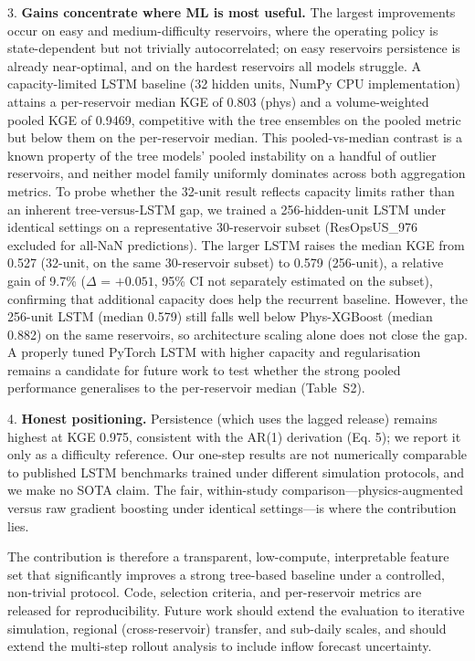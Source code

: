 \documentclass[journal]{ascelike-new}
\begin{document}
3. \textbf{Gains concentrate where ML is most useful.} The largest improvements occur on easy and medium-difficulty reservoirs, where the operating policy is state-dependent but not trivially autocorrelated; on easy reservoirs persistence is already near-optimal, and on the hardest reservoirs all models struggle. A capacity-limited LSTM baseline (32 hidden units, NumPy CPU implementation) attains a per-reservoir median KGE of 0.803 (phys) and a volume-weighted pooled KGE of 0.9469, competitive with the tree ensembles on the pooled metric but below them on the per-reservoir median. This pooled-vs-median contrast is a known property of the tree models' pooled instability on a handful of outlier reservoirs, and neither model family uniformly dominates across both aggregation metrics. To probe whether the 32-unit result reflects capacity limits rather than an inherent tree-versus-LSTM gap, we trained a 256-hidden-unit LSTM under identical settings on a representative 30-reservoir subset (ResOpsUS\_976 excluded for all-NaN predictions). The larger LSTM raises the median KGE from 0.527 (32-unit, on the same 30-reservoir subset) to 0.579 (256-unit), a relative gain of 9.7\% ($\Delta$ = $+0.051$, 95\% CI not separately estimated on the subset), confirming that additional capacity does help the recurrent baseline. However, the 256-unit LSTM (median 0.579) still falls well below Phys-XGBoost (median 0.882) on the same reservoirs, so architecture scaling alone does not close the gap. A properly tuned PyTorch LSTM with higher capacity and regularisation remains a candidate for future work to test whether the strong pooled performance generalises to the per-reservoir median (Table~S2).


4. \textbf{Honest positioning.} Persistence (which uses the lagged release) remains highest at KGE 0.975, consistent with the AR(1) derivation (Eq. 5); we report it only as a difficulty reference. Our one-step results are not numerically comparable to published LSTM benchmarks trained under different simulation protocols, and we make no SOTA claim. The fair, within-study comparison---physics-augmented versus raw gradient boosting under identical settings---is where the contribution lies.


The contribution is therefore a transparent, low-compute, interpretable feature set that significantly improves a strong tree-based baseline under a controlled, non-trivial protocol. Code, selection criteria, and per-reservoir metrics are released for reproducibility. Future work should extend the evaluation to iterative simulation, regional (cross-reservoir) transfer, and sub-daily scales, and should extend the multi-step rollout analysis to include inflow forecast uncertainty.
\end{document}
